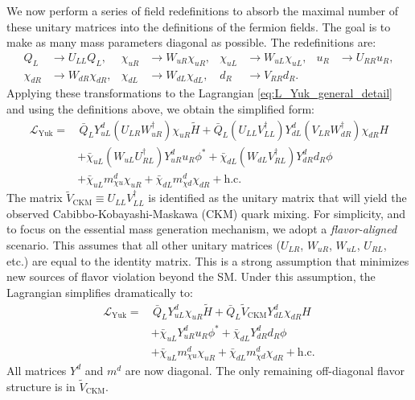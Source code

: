 We now perform a series of field redefinitions to absorb the maximal number of these unitary matrices into the definitions of the fermion fields. The goal is to make as many mass parameters diagonal as possible. The redefinitions are:
\begin{align*}
Q_L &\to U_{LL} Q_L, & \chi_{uR} &\to W_{uR} \chi_{uR}, & \chi_{uL} &\to W_{uL} \chi_{uL}, & u_R &\to U_{RR} u_R, \\
\chi_{dR} &\to W_{dR} \chi_{dR}, & \chi_{dL} &\to W_{dL} \chi_{dL}, & d_R &\to V_{RR} d_R.
\end{align*}
Applying these transformations to the Lagrangian \eqref{eq:L_Yuk_general_detail} and using the definitions above, we obtain the simplified form:
\begin{align*}
\mathcal{L}_{\text{Yuk}} = & \, \bar{Q}_{L} Y_{u L}^{d} (U_{L R} W_{u R}^{\dagger}) \chi_{u R} \tilde{H} + \bar{Q}_{L} (U_{LL}V_{LL}^\dagger) Y_{d L}^{d} (V_{L R} W_{d R}^{\dagger}) \chi_{d R} H \\
& + \bar{\chi}_{u L} (W_{u L} U_{R L}^{\dagger}) Y_{u R}^{d} u_{R} \phi^{*} + \bar{\chi}_{d L} (W_{d L} V_{R L}^{\dagger}) Y_{d R}^{d} d_{R} \phi \\
& + \bar{\chi}_{u L} m_{\chi u}^{d} \chi_{u R} + \bar{\chi}_{d L} m_{\chi d}^{d} \chi_{d R} + \text{h.c.}
\end{align*}
The matrix $\tilde{V}_{\text{CKM}} \equiv U_{LL}V_{LL}^\dagger$ is identified as the unitary matrix that will yield the observed Cabibbo-Kobayashi-Maskawa (CKM) quark mixing. For simplicity, and to focus on the essential mass generation mechanism, we adopt a \textit{flavor-aligned} scenario. This assumes that all other unitary matrices ($U_{LR}$, $W_{uR}$, $W_{uL}$, $U_{RL}$, etc.) are equal to the identity matrix. This is a strong assumption that minimizes new sources of flavor violation beyond the SM. Under this assumption, the Lagrangian simplifies dramatically to:
\begin{align*}
\mathcal{L}_{\text{Yuk}} = & \, \bar{Q}_{L} Y_{u L}^{d} \chi_{u R} \tilde{H} + \bar{Q}_{L} \tilde{V}_{\text{CKM}} Y_{d L}^{d} \chi_{d R} H \\
& + \bar{\chi}_{u L} Y_{u R}^{d} u_{R} \phi^{*} + \bar{\chi}_{d L} Y_{d R}^{d} d_{R} \phi \\
& + \bar{\chi}_{u L} m_{\chi u}^{d} \chi_{u R} + \bar{\chi}_{d L} m_{\chi d}^{d} \chi_{d R} + \text{h.c.}
\end{align*}
All matrices $Y^{d}$ and $m^{d}$ are now diagonal. The only remaining off-diagonal flavor structure is in $\tilde{V}_{\text{CKM}}$.


